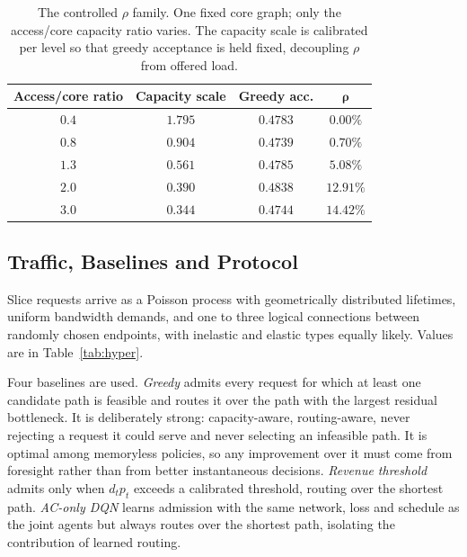 \documentclass[10pt,journal,comsoc]{IEEEtran}
\begin{document}
\begin{table}[t]
\centering
\caption{The controlled $\rho$ family. One fixed core graph; only the
access/core capacity ratio varies. The capacity scale is calibrated per
level so that greedy acceptance is held fixed, decoupling $\rho$ from
offered load.}
\label{tab:rhofamily}
\renewcommand{\arraystretch}{1.15}
\begin{tabular}{cccc}
\toprule
\textbf{Access/core ratio} & \textbf{Capacity scale} & \textbf{Greedy acc.} & $\boldsymbol{\rho}$ \\
\midrule
$0.4$ & $1.795$ & $0.4783$ & $0.00\%$ \\
$0.8$ & $0.904$ & $0.4739$ & $0.70\%$ \\
$1.3$ & $0.561$ & $0.4785$ & $5.08\%$ \\
$2.0$ & $0.390$ & $0.4838$ & $12.91\%$ \\
$3.0$ & $0.344$ & $0.4744$ & $14.42\%$ \\
\bottomrule
\end{tabular}
\end{table}

\subsection{Traffic, Baselines and Protocol}
Slice requests arrive as a Poisson process with geometrically distributed
lifetimes, uniform bandwidth demands, and one to three logical connections
between randomly chosen endpoints, with inelastic and elastic types
equally likely. Values are in Table~\ref{tab:hyper}.

Four baselines are used. \emph{Greedy} admits every request for which at
least one candidate path is feasible and routes it over the path with the
largest residual bottleneck. It is deliberately strong: capacity-aware,
routing-aware, never rejecting a request it could serve and never
selecting an infeasible path. It is optimal among memoryless policies, so
any improvement over it must come from foresight rather than from better
instantaneous decisions. \emph{Revenue threshold} admits only when
$d_t p_t$ exceeds a calibrated threshold, routing over the shortest path.
\emph{AC-only DQN} learns admission with the same network, loss and
schedule as the joint agents but always routes over the shortest path,
isolating the contribution of learned routing.
\end{document}
